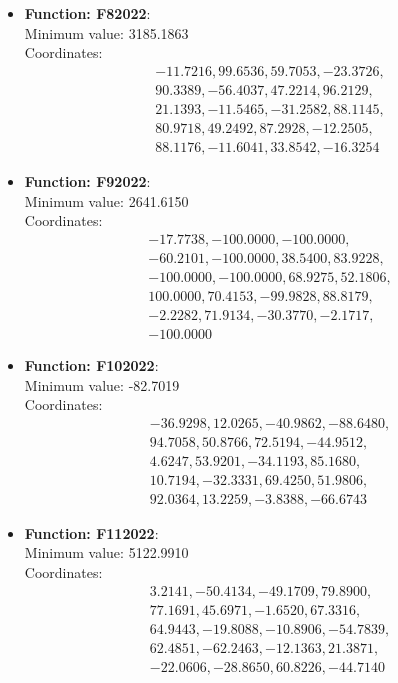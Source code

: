 \documentclass{article}
\begin{document}
\begin{itemize}
  \item \textbf{Function: F82022}: \\
    Minimum value: 3185.1863 \\
    Coordinates:
    \[
      \begin{aligned}
        & -11.7216, 99.6536, 59.7053, -23.3726, \\
        & 90.3389, -56.4037, 47.2214, 96.2129, \\
        & 21.1393, -11.5465, -31.2582, 88.1145, \\
        & 80.9718, 49.2492, 87.2928, -12.2505, \\
        & 88.1176, -11.6041, 33.8542, -16.3254
      \end{aligned}
    \]

  \item \textbf{Function: F92022}: \\
    Minimum value: 2641.6150 \\
    Coordinates:
    \[
      \begin{aligned}
        & -17.7738, -100.0000, -100.0000, \\
        & -60.2101, -100.0000, 38.5400, 83.9228, \\
        & -100.0000, -100.0000, 68.9275, 52.1806, \\
        & 100.0000, 70.4153, -99.9828, 88.8179, \\
        & -2.2282, 71.9134, -30.3770, -2.1717, \\
        & -100.0000
      \end{aligned}
    \]

  \item \textbf{Function: F102022}: \\
    Minimum value: -82.7019 \\
    Coordinates:
    \[
      \begin{aligned}
        & -36.9298, 12.0265, -40.9862, -88.6480, \\
        & 94.7058, 50.8766, 72.5194, -44.9512, \\
        & 4.6247, 53.9201, -34.1193, 85.1680, \\
        & 10.7194, -32.3331, 69.4250, 51.9806, \\
        & 92.0364, 13.2259, -3.8388, -66.6743
      \end{aligned}
    \]

  \item \textbf{Function: F112022}: \\
    Minimum value: 5122.9910 \\
    Coordinates:
    \[
      \begin{aligned}
        & 3.2141, -50.4134, -49.1709, 79.8900, \\
        & 77.1691, 45.6971, -1.6520, 67.3316, \\
        & 64.9443, -19.8088, -10.8906, -54.7839, \\
        & 62.4851, -62.2463, -12.1363, 21.3871, \\
        & -22.0606, -28.8650, 60.8226, -44.7140
      \end{aligned}
    \]


\end{itemize}
\end{document}
